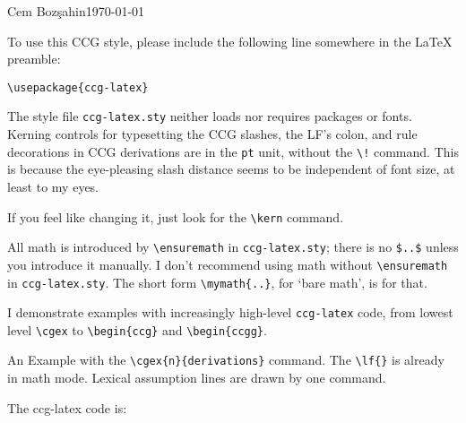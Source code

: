 \documentclass[11pt]{article}
\begin{document}
\hfill{\small Cem Boz\c{s}ahin}\hfill\today\medskip\bigskip

\noindent To use this CCG style, please include the following line somewhere in the \LaTeX\,preamble:\medskip

\begin{verbatim}
\usepackage{ccg-latex}
\end{verbatim}\medskip


The style file \verb|ccg-latex.sty| neither loads nor requires  packages or fonts. Kerning controls for typesetting the CCG slashes, the  LF's colon, and rule decorations in CCG derivations are in the \verb|pt| unit, without the \verb|\!| command. This is because the eye-pleasing slash distance seems to be independent of font size, at least to my eyes.

If you feel like changing it, just look for the \verb|\kern| command. 

All math is introduced by \verb|\ensuremath| in \verb|ccg-latex.sty|; 
there is no \verb|$..$| unless you introduce it manually. I don't recommend
using math without \verb|\ensuremath| in \verb|ccg-latex.sty|.
The short form \verb|\mymath{..}|, for `bare math', is for that.


I demonstrate examples with increasingly high-level \verb|ccg-latex| code, from lowest
level \verb|\cgex| to \verb|\begin{ccg}| and \verb|\begin{ccgg}|.\bigskip

An Example with the \verb|\cgex{n}{derivations}| command. The \verb|\lf{}| is already in math mode.
Lexical assumption lines are drawn by one command.
\bigskip

\medskip\bigskip

The ccg-latex code is:
\end{document}
